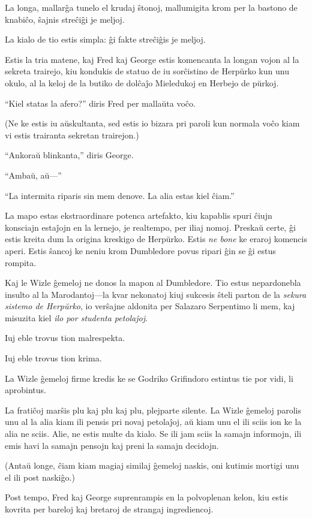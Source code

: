 
La longa, mallarĝa tunelo el krudaj ŝtonoj, mallumigita krom per la
bastono de knabiĉo, ŝajnis streĉiĝi je meljoj.

La kialo de tio estis simpla: ĝi fakte streĉiĝis je meljoj.

Estis la tria matene, kaj Fred kaj George estis komencanta la longan
vojon al la sekreta trairejo, kiu kondukis de statuo de iu sorĉistino
de Herpŭrko kun unu okulo, al la keloj de la butiko de dolĉaĵo
Mieledukoj en Herbejo de pŭrkoj.

``Kiel statas la afero?'' diris Fred per mallaŭta voĉo.

(Ne ke estis iu aŭskultanta, sed estis io bizara pri paroli kun
normala voĉo kiam vi estis trairanta sekretan trairejon.)

``Ankoraŭ blinkanta,'' diris George.

``Ambaŭ, aŭ—'' 

``La intermita riparis sin mem denove. La alia estas kiel ĉiam.''

La mapo estas ekstraordinare potenca artefakto, kiu kapablis spuri
ĉiujn konsciajn estaĵojn en la lernejo, je realtempo, per iliaj
nomoj. Preskaŭ certe, ĝi estis kreita dum la origina kreskigo de
Herpŭrko. Estis \emph{ne bone} ke eraroj komencis aperi. Estis ŝancoj
ke neniu krom Dumbledore povus ripari ĝin se ĝi estus rompita.

Kaj le Wizle ĝemeloj ne donos la mapon al Dumbledore. Tio estus
nepardonebla insulto al la Marodantoj—la kvar nekonatoj kiuj sukcesis
ŝteli parton de la \emph{sekura sistemo de Herpŭrko}, io verŝajne
aldonita per Salazaro Serpentimo li mem, kaj misuzita kiel \emph{ilo
  por studenta petolaĵoj}.

Iuj eble trovus tion malrespekta.

Iuj eble trovus tion krima.

La Wizle ĝemeloj firme kredis ke se Godriko Grifindoro estintus tie
por vidi, li aprobintus.

La fratiĉoj marŝis plu kaj plu kaj plu, plejparte silente. La Wizle
ĝemeloj parolis unu al la alia kiam ili pensis pri novaj petolaĵoj, aŭ
kiam unu el ili sciis ion ke la alia ne sciis. Alie, ne estis multe da
kialo. Se ili jam sciis la samajn informojn, ili emis havi la samajn
pensojn kaj preni la samajn decidojn.

(Antaŭ longe, ĉiam kiam magiaj similaj ĝemeloj naskis, oni kutimis
mortigi unu el ili post naskiĝo.)

Post tempo, Fred kaj George suprenrampis en la polvoplenan kelon, kiu
estis kovrita per bareloj kaj bretaroj de strangaj ingrediencoj.

